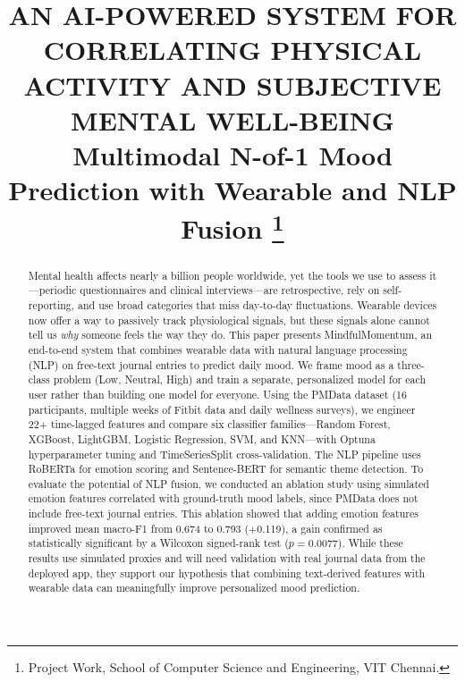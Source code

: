 \documentclass[conference]{IEEEtran}
\begin{document}
\title{AN AI-POWERED SYSTEM FOR CORRELATING PHYSICAL ACTIVITY AND SUBJECTIVE MENTAL WELL-BEING\\
{\footnotesize Multimodal N-of-1 Mood Prediction with Wearable and NLP Fusion}
\thanks{Project Work, School of Computer Science and Engineering, VIT Chennai.}
}

\author{
\and
{}
}

\maketitle

\begin{abstract}
Mental health affects nearly a billion people worldwide, yet the tools we use to assess it---periodic questionnaires and clinical interviews---are retrospective, rely on self-reporting, and use broad categories that miss day-to-day fluctuations. Wearable devices now offer a way to passively track physiological signals, but these signals alone cannot tell us \textit{why} someone feels the way they do. This paper presents MindfulMomentum, an end-to-end system that combines wearable data with natural language processing (NLP) on free-text journal entries to predict daily mood. We frame mood as a three-class problem (Low, Neutral, High) and train a separate, personalized model for each user rather than building one model for everyone. Using the PMData dataset (16 participants, multiple weeks of Fitbit data and daily wellness surveys), we engineer 22+ time-lagged features and compare six classifier families---Random Forest, XGBoost, LightGBM, Logistic Regression, SVM, and KNN---with Optuna hyperparameter tuning and TimeSeriesSplit cross-validation. The NLP pipeline uses RoBERTa for emotion scoring and Sentence-BERT for semantic theme detection. To evaluate the potential of NLP fusion, we conducted an ablation study using simulated emotion features correlated with ground-truth mood labels, since PMData does not include free-text journal entries. This ablation showed that adding emotion features improved mean macro-F1 from 0.674 to 0.793 (+0.119), a gain confirmed as statistically significant by a Wilcoxon signed-rank test ($p = 0.0077$). While these results use simulated proxies and will need validation with real journal data from the deployed app, they support our hypothesis that combining text-derived features with wearable data can meaningfully improve personalized mood prediction.
\end{abstract}
\end{document}
